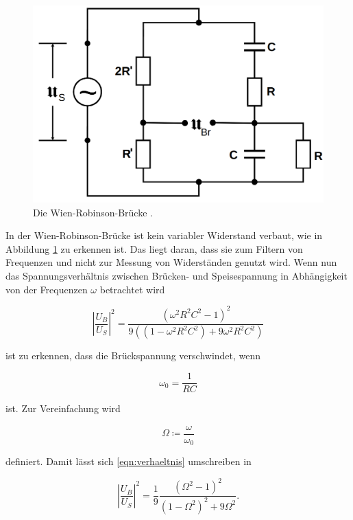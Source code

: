 \begin{figure}
    \centering
    \includegraphics[scale=0.25]{content/Wien-Robinson-Bruecke.png}
    \caption{Die Wien-Robinson-Brücke \cite[S. 223]{anleitung}.}
    \label{fig:wien}
\end{figure}

In der Wien-Robinson-Brücke ist kein variabler Widerstand verbaut, wie in Abbildung \ref{fig:wien}
zu erkennen ist.
Das liegt daran, dass sie zum Filtern von Frequenzen und nicht zur Messung von Widerständen genutzt wird.
Wenn nun das Spannungsverhältnis zwischen Brücken- und Speisespannung in Abhängigkeit von der Frequenzen $\omega$ betrachtet wird 

\begin{equation}
    \left | \frac{U_B}{U_S} \right |^2 = \frac{(\omega^2R^2C^2-1)^2}{9((1-\omega^2R^2C^2) + 9 \omega^2 R^2 C^2)}
    \label{eqn:verhaeltnis}
\end{equation}

ist zu erkennen, dass die Brückspannung verschwindet, wenn 

\begin{equation}
    \omega_0 = \frac{1}{RC}
    \label{eqn:wien_rc}
\end{equation}

ist. Zur Vereinfachung wird 

\begin{equation*}
    \Omega \coloneq \frac{\omega}{\omega_0}
\end{equation*}

definiert. Damit lässt sich \eqref{eqn:verhaeltnis} umschreiben in

\begin{equation}
    \left | \frac{U_B}{U_S} \right |^2 = \frac{1}{9} \frac{(\Omega^2 -1)^2}{(1-\Omega^2)^2 + 9\Omega^2}.
    \label{eqn:wien_verh}
\end{equation}

